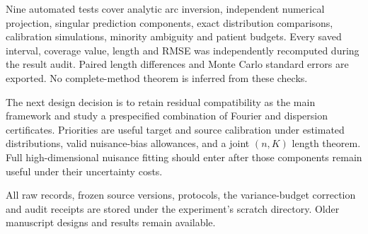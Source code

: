 \documentclass[11pt]{article}
\begin{document}
Nine automated tests cover analytic arc inversion, independent numerical
projection, singular prediction components, exact distribution comparisons,
calibration simulations, minority ambiguity and patient budgets. Every saved
interval, coverage value, length and RMSE was independently recomputed during
the result audit. Paired length differences and Monte Carlo standard errors
are exported. No complete-method theorem is inferred from these checks.

The next design decision is to retain residual compatibility as the main
framework and study a prespecified combination of Fourier and dispersion
certificates. Priorities are useful target and source calibration under
estimated distributions, valid nuisance-bias allowances, and a joint
$(n,K)$ length theorem. Full high-dimensional nuisance fitting should enter
after those components remain useful under their uncertainty costs.

All raw records, frozen source versions, protocols, the variance-budget
correction and audit receipts are stored under the experiment's scratch
directory. Older manuscript designs and results remain available.



\end{document}
